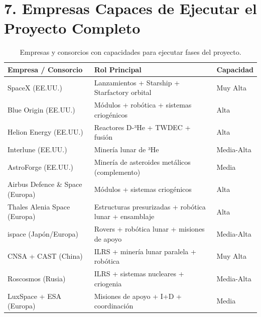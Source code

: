 \documentclass[11pt,a4paper]{article}
\begin{document}
\section{7. Empresas Capaces de Ejecutar el Proyecto Completo}
\begin{table}[H]
\centering
\small
\begin{tabularx}{\textwidth}{l X X}
\toprule
\textbf{Empresa / Consorcio} & \textbf{Rol Principal} & \textbf{Capacidad} \\
\midrule
SpaceX (EE.UU.) & Lanzamientos + Starship + Starfactory orbital & Muy Alta \\
Blue Origin (EE.UU.) & Módulos + robótica + sistemas criogénicos & Alta \\
Helion Energy (EE.UU.) & Reactores D-³He + TWDEC + fusión & Alta \\
Interlune (EE.UU.) & Minería lunar de ³He & Media-Alta \\
AstroForge (EE.UU.) & Minería de asteroides metálicos (complemento) & Media \\
Airbus Defence \& Space (Europa) & Módulos + sistemas criogénicos & Alta \\
Thales Alenia Space (Europa) & Estructuras presurizadas + robótica lunar + ensamblaje & Alta \\
ispace (Japón/Europa) & Rovers + robótica lunar + misiones de apoyo & Media-Alta \\
CNSA + CAST (China) & ILRS + minería lunar paralela + robótica & Muy Alta \\
Roscosmos (Rusia) & ILRS + sistemas nucleares + criogenia & Media-Alta \\
LuxSpace + ESA (Europa) & Misiones de apoyo + I+D + coordinación & Media \\
\bottomrule
\end{tabularx}
\caption{Empresas y consorcios con capacidades para ejecutar fases del proyecto.}
\end{table}
\end{document}
